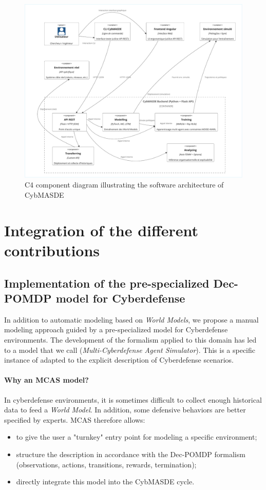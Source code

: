 \begin{figure}[H]
\centering
\includegraphics[width=\textwidth]{figures/CybMASDE_internal_component_diagram.pdf}
\caption{C4 component diagram illustrating the software architecture of CybMASDE}
\label{fig:cybmasde_uml}
\end {figure}

\section{Integration of the different contributions}

\subsection{Implementation of the pre-specialized Dec-POMDP model for Cyberdefense}

In addition to automatic modeling based on \textit{World Models}, we propose a manual modeling approach guided by a pre-specialized model for Cyberdefense environments.
The development of the  formalism applied to this domain has led to a model that we call  (\textit{Multi-Cyberdefense Agent Simulator}). This is a specific instance of  adapted to the explicit description of Cyberdefense scenarios.

\paragraph {Why an MCAS model?}
In cyberdefense environments, it is sometimes difficult to collect enough historical data to feed a \textit{World Model}. In addition, some defensive behaviors are better specified by experts. MCAS therefore allows:
\begin{itemize}
  \item to give the user a "turnkey" entry point for modeling a specific environment;
  \item structure the description in accordance with the Dec-POMDP formalism (observations, actions, transitions, rewards, termination);
  \item directly integrate this model into the CybMASDE cycle.
\end{itemize}

